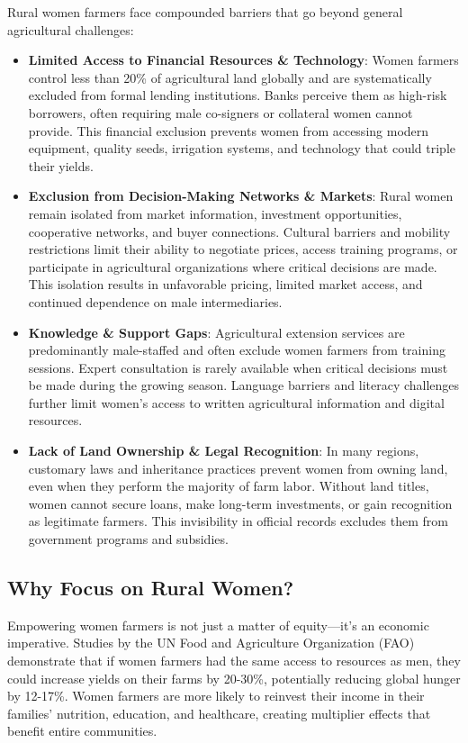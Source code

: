 \documentclass[9pt,twocolumn,twoside]{article}
\begin{document}
Rural women farmers face compounded barriers that go beyond general agricultural challenges:

\begin{itemize}
  \item \textbf{Limited Access to Financial Resources \& Technology}: Women farmers control less than 20\% of agricultural land globally and are systematically excluded from formal lending institutions. Banks perceive them as high-risk borrowers, often requiring male co-signers or collateral women cannot provide. This financial exclusion prevents women from accessing modern equipment, quality seeds, irrigation systems, and technology that could triple their yields.

  \item \textbf{Exclusion from Decision-Making Networks \& Markets}: Rural women remain isolated from market information, investment opportunities, cooperative networks, and buyer connections. Cultural barriers and mobility restrictions limit their ability to negotiate prices, access training programs, or participate in agricultural organizations where critical decisions are made. This isolation results in unfavorable pricing, limited market access, and continued dependence on male intermediaries.

  \item \textbf{Knowledge \& Support Gaps}: Agricultural extension services are predominantly male-staffed and often exclude women farmers from training sessions. Expert consultation is rarely available when critical decisions must be made during the growing season. Language barriers and literacy challenges further limit women's access to written agricultural information and digital resources.

  \item \textbf{Lack of Land Ownership \& Legal Recognition}: In many regions, customary laws and inheritance practices prevent women from owning land, even when they perform the majority of farm labor. Without land titles, women cannot secure loans, make long-term investments, or gain recognition as legitimate farmers. This invisibility in official records excludes them from government programs and subsidies.
\end{itemize}

\subsection{Why Focus on Rural Women?}

Empowering women farmers is not just a matter of equity—it's an economic imperative. Studies by the UN Food and Agriculture Organization (FAO) demonstrate that if women farmers had the same access to resources as men, they could increase yields on their farms by 20-30\%, potentially reducing global hunger by 12-17\%. Women farmers are more likely to reinvest their income in their families' nutrition, education, and healthcare, creating multiplier effects that benefit entire communities.
\end{document}
